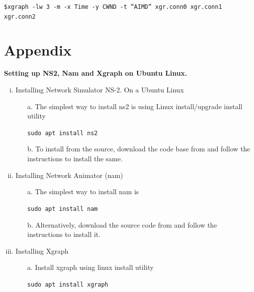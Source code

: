 \begin{multicols}{2}
\begin{itemize}
\texttt{\$xgraph -lw 3 -m -x Time -y CWND -t ``AIMD” xgr.conn0 xgr.conn1 xgr.conn2}

\end{itemize}

\section*{Appendix}

\noindent
\textbf{Setting up NS2, Nam and Xgraph on Ubuntu Linux.}

\begin{enumerate}[i.]

\item Installing Network Simulator NS-2. On a Ubuntu Linux

  \begin{itemize}
   \item[a.] The simplest way to install ns2 is using Linux install/upgrade install utility
   
   \texttt{sudo apt install ns2}

  \item[b.] To install from the source, download the code base from \cite{art2-key09} and follow the instructions to install the same.
  \end{itemize}

\item Installing Network Animator (nam)
      
      \begin{itemize}
   \item[a.] The simplest way to install nam is
   
   \texttt{sudo apt install nam}
   
   \item[b.] Alternatively, download the source code from \cite{art2-key10} and follow the instructions to install it.
   
   \end{itemize}

\item Installing Xgraph


\begin{itemize}
   \item[a.] Install xgraph \cite{art2-key11} \cite{art2-key15} using linux install utility
   
   \texttt{sudo apt install xgraph}
   
   \end{itemize}

\end{enumerate}


\end{multicols}

